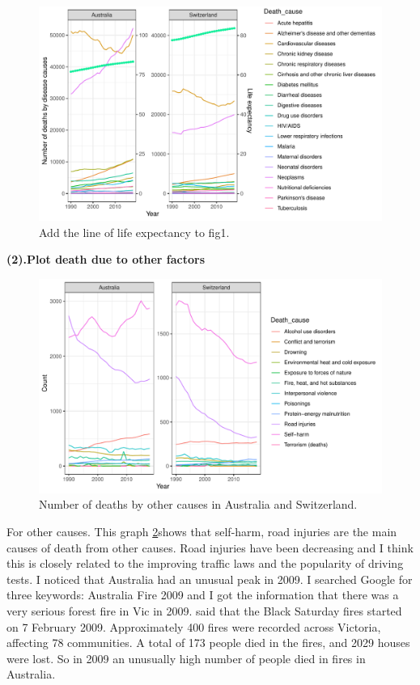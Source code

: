 \documentclass[11pt,a4paper,]{article}
\begin{document}
\begin{figure}
\centering
\includegraphics{Assignment4_files/figure-latex/diseaseplot1-1.pdf}
\caption{\label{fig:diseaseplot1}Add the line of life expectancy to fig1.}
\end{figure}

\textbf{(2).Plot death due to other factors}

\begin{figure}
\centering
\includegraphics{Assignment4_files/figure-latex/otherplot-1.pdf}
\caption{\label{fig:otherplot}Number of deaths by other causes in Australia and Switzerland.}
\end{figure}

For other causes. This graph \ref{fig:otherplot}shows that self-harm, road injuries are the main causes of death from other causes. Road injuries have been decreasing and I think this is closely related to the improving traffic laws and the popularity of driving tests. I noticed that Australia had an unusual peak in 2009. I searched Google for three keywords: Australia Fire 2009 and I got the information that there was a very serious forest fire in Vic in 2009. \textcite{Bushfire} said that the Black Saturday fires started on 7 February 2009. Approximately 400 fires were recorded across Victoria, affecting 78 communities. A total of 173 people died in the fires, and 2029 houses were lost. So in 2009 an unusually high number of people died in fires in Australia.
\end{document}
